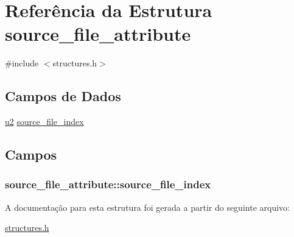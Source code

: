 \hypertarget{structsource__file__attribute}{}\section{Referência da Estrutura source\+\_\+file\+\_\+attribute}
\label{structsource__file__attribute}


{\ttfamily \#include $<$structures.\+h$>$}

\subsection*{Campos de Dados}
\begin{DoxyCompactItemize}
\item 
\hyperlink{lista__operandos_8h_a732cde1300aafb73b0ea6c2558a7a54f}{u2} \hyperlink{structsource__file__attribute_af0056307fb509ddd8301100fd2cd84d9}{source\+\_\+file\+\_\+index}
\end{DoxyCompactItemize}


\subsection{Campos}
\subsubsection[{\texorpdfstring{source\+\_\+file\+\_\+index}{source_file_index}}]{ source\+\_\+file\+\_\+attribute\+::source\+\_\+file\+\_\+index}\hypertarget{structsource__file__attribute_af0056307fb509ddd8301100fd2cd84d9}{}\label{structsource__file__attribute_af0056307fb509ddd8301100fd2cd84d9}


A documentação para esta estrutura foi gerada a partir do seguinte arquivo\+:\begin{DoxyCompactItemize}
\item 
\hyperlink{structures_8h}{structures.\+h}\end{DoxyCompactItemize}
